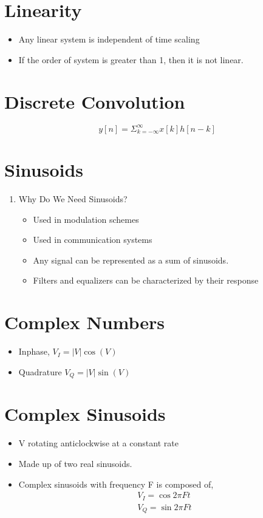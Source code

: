 \documentclass[11pt]{report}
\begin{document}
\section{Linearity}
\label{sec:org286224a}
\begin{itemize}
\item Any linear  system is independent of time scaling
\item If the order of system is greater than 1, then it is not linear.
\end{itemize}
\section{Discrete Convolution}
\label{sec:orgacc2079}
$$y[n] = \Sigma_{k = -\infty}^{\infty}x[k]h[n-k]$$
\section{Sinusoids}
\label{sec:orgf6f79c6}
\begin{enumerate}
\item Why Do We Need Sinusoids?
\label{sec:org6801b64}
\begin{itemize}
\item Used in modulation schemes
\item Used in communication systems
\item Any signal can be represented as a sum of sinusoids.
\item Filters and equalizers can be characterized by their response
\end{itemize}
\end{enumerate}
\section{Complex Numbers}
\label{sec:org983677c}
\begin{itemize}
\item Inphase, \(V_I = |V| \cos(V)\)
\item Quadrature \(V_Q = |V| \sin(V)\)
\end{itemize}
\section{Complex Sinusoids}
\label{sec:orgd01b7c6}
\begin{itemize}
\item V rotating anticlockwise at a constant rate
\item Made up of two real sinusoids.
\item Complex sinusoids with frequency F is composed of,
\begin{align*}
V_I = \cos 2 \pi Ft \\
V_Q = \sin 2 \pi Ft \\
\end{align*}
\end{itemize}
\end{document}
